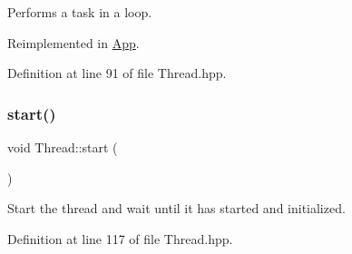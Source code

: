 Performs a task in a loop. 

Reimplemented in \mbox{\hyperlink{classApp_a743d0b0456b0557e1659ea950e6f17cd}{App}}.



Definition at line 91 of file Thread.\+hpp.


\begin{DoxyCode}{0}

\end{DoxyCode}
\mbox{\label{classThread_a1f53ee62bd30a7924186ef26150ce262}} 
\subsubsection{\texorpdfstring{start()}{start()}}
{\footnotesize\ttfamily void Thread\+::start (\begin{DoxyParamCaption}{ }\end{DoxyParamCaption})\hspace{0.3cm}{\ttfamily [inline]}}

Start the thread and wait until it has started and initialized. 

Definition at line 117 of file Thread.\+hpp.


